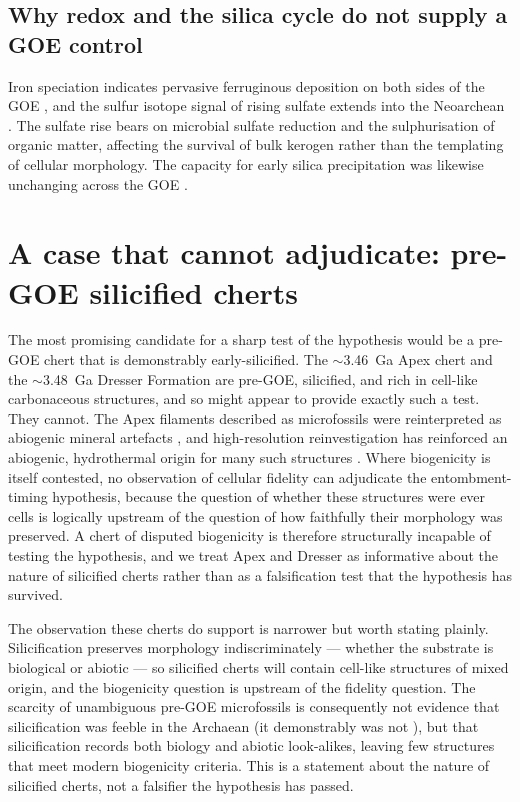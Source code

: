 \documentclass[11pt]{article}
\begin{document}
\subsection{Why redox and the silica cycle do not supply a GOE control}

Iron speciation indicates pervasive ferruginous deposition on both sides of the GOE
\citep{Canfield1998,Poulton2011}, and the sulfur isotope signal of rising sulfate extends into the
Neoarchean \citep{Reinhard2009,Philippot2018}. The sulfate rise bears on microbial sulfate
reduction and the sulphurisation of organic matter, affecting the survival of bulk kerogen rather
than the templating of cellular morphology. The capacity for early silica precipitation was likewise
unchanging across the GOE \citep{Siever1992,Perry2007}.

\section{A case that cannot adjudicate: pre-GOE silicified cherts}\label{sec:falsify}

The most promising candidate for a sharp test of the hypothesis would be a pre-GOE chert that is
demonstrably early-silicified. The $\sim$3.46~Ga Apex chert and the $\sim$3.48~Ga Dresser Formation
are pre-GOE, silicified, and rich in cell-like carbonaceous structures, and so might appear to
provide exactly such a test. They cannot. The Apex filaments described as microfossils
\citep{Schopf1993} were reinterpreted as abiogenic mineral artefacts \citep{Brasier2002}, and
high-resolution reinvestigation has reinforced an abiogenic, hydrothermal origin for many such
structures \citep{Wacey2014}. Where biogenicity is itself contested, no observation of cellular
fidelity can adjudicate the entombment-timing hypothesis, because the question of whether these
structures were ever cells is logically upstream of the question of how faithfully their morphology
was preserved. A chert of disputed biogenicity is therefore structurally incapable of testing the
hypothesis, and we treat Apex and Dresser as informative about the nature of silicified cherts
rather than as a falsification test that the hypothesis has survived.

The observation these cherts do support is narrower but worth stating plainly. Silicification
preserves morphology indiscriminately --- whether the substrate is biological or abiotic --- so
silicified cherts will contain cell-like structures of mixed origin, and the biogenicity question is
upstream of the fidelity question. The scarcity of unambiguous pre-GOE microfossils is consequently
not evidence that silicification was feeble in the Archaean (it demonstrably was not
\citep{Siever1992,Perry2007}), but that silicification records both biology and abiotic look-alikes,
leaving few structures that meet modern biogenicity criteria. This is a statement about the nature
of silicified cherts, not a falsifier the hypothesis has passed.
\end{document}
